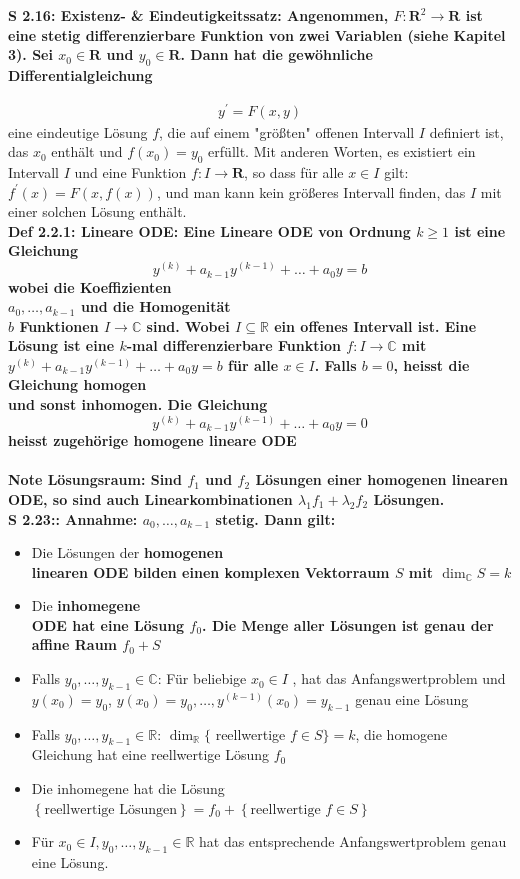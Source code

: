 \documentclass[7pt,landscape, margin = 0.1mm]{article}
\newcommand{\COL}[1]{ \color{chaptercolor} \bf{#1}\color{black}     \\}
\newcommand{\DEF}[2]{\color{chaptercolor}\bf{Def #1}:\color{black}    \hspace{0.2cm} #2 \\}
\newcommand{\NOTE}[2]{\color{chaptercolor}\bf{Note #1}:\color{black}    \hspace{0.2cm} #2 \\}
\newcommand{\SA}[2]{\color{chaptercolor}\bf{S #1}:\color{black}    \hspace{0.2cm} #2 \\}
\begin{document}
\begin{multicols}{4}
\begin{flushleft}
\SA{2.16: Existenz- & Eindeutigkeitssatz}{ Angenommen, $F: \mathbf{R}^{2} \rightarrow \mathbf{R}$ ist eine stetig differenzierbare Funktion von zwei Variablen (siehe Kapitel 3). Sei $x_{0} \in \mathbf{R}$ und $y_{0} \in \mathbf{R}$. Dann hat die gewöhnliche Differentialgleichung
 
 \begin{align*}
  y^{\prime}=F(x, y)
 \end{align*}
eine eindeutige Lösung $f$, die auf einem "größten" offenen Intervall $I$ definiert ist, das $x_{0}$ enthält und $f\left(x_{0}\right)=y_{0}$ erfüllt. Mit anderen Worten, es existiert ein Intervall $I$ und eine Funktion $f: I \rightarrow \mathbf{R}$, so dass für alle $x \in I$ gilt: $f^{\prime}(x)=F(x, f(x))$, und man kann kein größeres Intervall finden, das $I$ mit einer solchen Lösung enthält.}





\DEF{2.2.1: Lineare ODE}{Eine Lineare ODE von Ordnung $k\geq 1$ ist eine Gleichung $$y^{(k)}+ a_{k-1}y^{(k-1)}+ \ldots + a_{0}y = b $$ wobei die \COL{Koeffizienten} $a_{0}, \ldots, a_{k-1}$ und die \COL{Homogenität} $b$ Funktionen $I \to \mathbb{C}$ sind. Wobei $I \subseteq \mathbb{R}$ ein offenes Intervall ist. Eine Lösung ist eine $k$-mal differenzierbare Funktion $f:I\to \mathbb{C}$ mit $y^{(k)}+ a_{k-1}y^{(k-1)}+ \ldots + a_{0}y = b$ für alle $x \in I$.
 Falls $b=0$, heisst die Gleichung \COL{homogen} und sonst inhomogen.
 Die Gleichung $$ y^{(k)}+ a_{k-1}y^{(k-1)}+ \ldots + a_{0}y = 0$$ heisst \COL{zugehörige homogene lineare ODE} }

\NOTE{Lösungsraum}{Sind $f_1$ und $f_2$ Lösungen einer homogenen linearen ODE, so sind auch Linearkombinationen $\lambda_{1}f_{1}+ \lambda_{2}f_2$ Lösungen.}
\SA{2.23:}{Annahme: $a_{0},\ldots, a_{k-1}$ stetig. Dann gilt:
\begin{itemize}

\item  Die Lösungen der \COL{homogenen} linearen ODE bilden einen komplexen Vektorraum $S$ mit $\dim_{\mathbb{C}}S=k$
\item   Die \COL{inhomegene} ODE hat eine Lösung $f_0$. Die Menge aller Lösungen ist genau der affine Raum $f_{0}+S$
\item   Falls $y_{0},\ldots, y_{k-1}\in \mathbb{C}$: Für beliebige $x_{0}\in I$ ,  hat das Anfangswertproblem und $y(x_{0})=y_{0}$, $y\left(x_0\right)=y_0, \ldots, y^{(k-1)}\left(x_0\right)=y_{k-1}$ genau eine Lösung
\item    Falls $y_{0},\ldots, y_{k-1}\in \mathbb{R}$: $\operatorname{dim}_{\mathbb{R}}\{$ reellwertige $f \in S\}=k$, die  homogene Gleichung hat eine reellwertige Lösung $f_0$
\item   	 Die inhomegene hat die Lösung $\left\{\text{reellwertige Lösungen} \right\} = f_{0}+ \left\{ \text{reellwertige } f \in S\right\}$ 
\item   	 Für $x_0 \in I, y_0, \ldots, y_{k-1} \in \mathbb{R}$ hat das entsprechende Anfangswertproblem genau eine Lösung.


\end{itemize}}
\end{flushleft}
\end{multicols}
\end{document}
